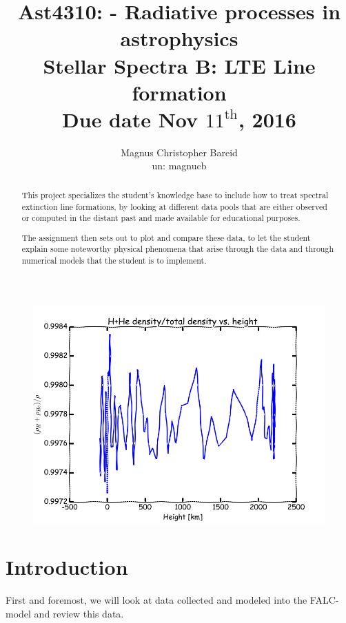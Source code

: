 \documentclass[11pt,a4paper,notitlepage]{article}
\title{\normalsize Ast4310: - Radiative processes in astrophysics \\
\vspace{10mm}
\huge Stellar Spectra B: LTE Line formation\\
\vspace{10mm}
\normalsize Due date {\bf Nov $11^\text{th}$, 2016}}
\author{Magnus Christopher Bareid \\ un: magnucb }
\begin{document}
\noindent
\maketitle
\vspace{5mm}

\begin{figure}[H]
	\centering	
	\includegraphics[scale=0.45]{frontpage.png}
\end{figure}
\begin{abstract}
This project specializes the student's knowledge base to include how to treat spectral extinction line formations, by looking at different data pools that are either observed or computed in the distant past and made available for educational purposes.

The assignment then sets out to plot and compare these data, to let the student explain some noteworthy physical phenomena that arise through the data and through numerical models that the student is to implement.
\end{abstract}


\newpage
\tableofcontents

\newpage
\section*{Introduction}
First and foremost, we will look at data collected and modeled into the FALC-model and review this data.
\end{document}
